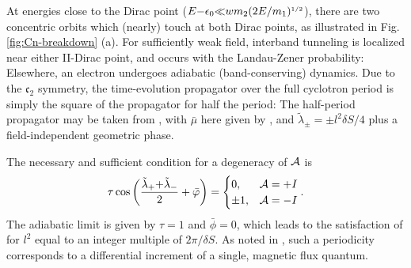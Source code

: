 \documentclass[aps, prb, showpacs, twocolumn, notitlepage, superscriptaddress]{revtex4-1}
\begin{document}
At energies close to the Dirac point ($E{-}\epsilon_0 {\ll} wm_2(2E/m_1)^{\scriptscriptstyle{1/2}}$), there are two concentric orbits which (nearly) touch at both Dirac points, as illustrated in Fig. \ref{fig:Cn-breakdown} (a). For sufficiently weak field, interband tunneling is localized near either II-Dirac point, and occurs with the Landau-Zener probability:
Elsewhere, an electron undergoes adiabatic (band-conserving) dynamics. Due to the $\mathfrak{c}_2$ symmetry, the time-evolution propagator over the full cyclotron period is simply the square of the propagator for half the period: 
The half-period propagator may be taken from , with  $\bar{\mu}$ here given by , and  $\tilde{\lambda}_{\pm}{=}{\pm}l^2\delta S/4$ plus a field-independent geometric phase.
 






The necessary and sufficient condition for a degeneracy of ${\cal A}$ is \begin{align}\tau\cos\bigg(\f{\tilde{\lambda}_+{+}\tilde{\lambda}_-}{2}+\bar{\varphi}\bigg)= \begin{cases} 0, & {\A}=+I \\
                 \pm 1, & \A =-I\end{cases}.\la{c2breakdowndgncondition}
\end{align}
The adiabatic limit is given by $\tau{=}1$ and $\bar{\phi}{=}0$, which leads to the satisfaction of  for $l^2$ equal to an integer multiple of $2\pi/\delta S$. As noted  in , such a periodicity  corresponds to a differential increment of a single, magnetic flux quantum. 
\end{document}
